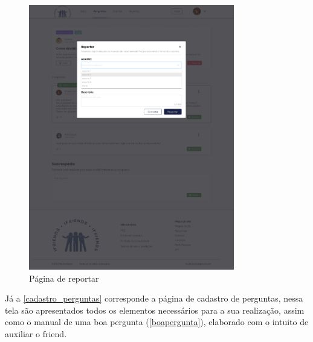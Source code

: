 \begin{figure}[htb]
\centering
\caption{\label{cl_pergunta-reportar_respostas} Página de reportar}
\includegraphics[width=0.8\textwidth]{anexos/Imagens_Prototipo/com_login/pergunta-reportar_respostas.png}
\end{figure}
\FloatBarrier

Já a \autoref{cadastro_perguntas} corresponde a página de cadastro de perguntas, nessa tela são apresentados todos os elementos necessários para a sua realização, assim como o manual de uma boa pergunta (\autoref{boapergunta}), elaborado com o intuito de auxiliar o \gls{friend}. 

